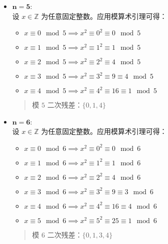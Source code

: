 \begin{example}
\begin{itemize}
        \item $\mathbf{n=5}$:\\
        设 $x \in \mathbb{Z}$ 为任意固定整数。应用模算术引理可得：
        \begin{itemize}
            \item $x \equiv 0 \mod 5 \implies x^2 \equiv 0^2 \equiv 0 \mod 5$
            \item $x \equiv 1 \mod 5 \implies x^2 \equiv 1^2 \equiv 1 \mod 5$
            \item $x \equiv 2 \mod 5 \implies x^2 \equiv 2^2 \equiv 4 \mod 5$
            \item $x \equiv 3 \mod 5 \implies x^2 \equiv 3^2 \equiv 9 \equiv 4 \mod 5$
            \item $x \equiv 4 \mod 5 \implies x^2 \equiv 4^2 \equiv 16 \equiv 1 \mod 5$
        \end{itemize}
        \begin{quotation}
            \begin{center}
                \large 模 $5$ 二次残差：$\{0, 1, 4\}$
            \end{center}
        \end{quotation}

        \item $\mathbf{n=6}$:\\
        设 $x \in \mathbb{Z}$ 为任意固定整数。应用模算术引理可得：
        \begin{itemize}
            \item $x \equiv 0 \mod 6 \implies x^2 \equiv 0^2 \equiv 0 \mod 6$
            \item $x \equiv 1 \mod 6 \implies x^2 \equiv 1^2 \equiv 1 \mod 6$
            \item $x \equiv 2 \mod 6 \implies x^2 \equiv 2^2 \equiv 4 \mod 6$
            \item $x \equiv 3 \mod 6 \implies x^2 \equiv 3^2 \equiv 9 \equiv 3 \mod 6$
            \item $x \equiv 4 \mod 6 \implies x^2 \equiv 4^2 \equiv 16 \equiv 4 \mod 6$
            \item $x \equiv 5 \mod 6 \implies x^2 \equiv 5^2 \equiv 25 \equiv 1 \mod 6$
        \end{itemize}
        \begin{quotation}
            \begin{center}
                \large 模 $6$ 二次残差：$\{0, 1, 3, 4\}$
            \end{center}
        \end{quotation}


\end{itemize}
\end{example}
